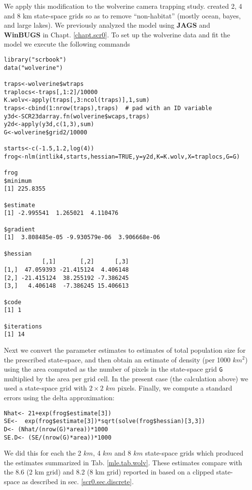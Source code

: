 We apply this modification to the wolverine camera trapping
study. \citet{royle_etal:2011jwm} created 2, 4 and 8 km state-space
grids so as to remove ``non-habitat'' (mostly ocean, bayes, and large
lakes). We previously analyzed the model using {\bf JAGS} and {\bf WinBUGS} in
Chapt. \ref{chapt.scr0}.  To set up the wolverine data and fit the
model we execute the following commands
{\small 
\begin{verbatim}
library("scrbook")
data("wolverine")

traps<-wolverine$wtraps
traplocs<-traps[,1:2]/10000
K.wolv<-apply(traps[,3:ncol(traps)],1,sum)
traps<-cbind(1:nrow(traps),traps)  # pad with an ID variable
y3d<-SCR23darray.fn(wolverine$wcaps,traps)
y2d<-apply(y3d,c(1,3),sum)
G<-wolverine$grid2/10000

starts<-c(-1.5,1.2,log(4))
frog<-nlm(intlik4,starts,hessian=TRUE,y=y2d,K=K.wolv,X=traplocs,G=G)

frog
$minimum
[1] 225.8355

$estimate
[1] -2.995541  1.265021  4.110476

$gradient
[1]  3.808485e-05 -9.930579e-06  3.906668e-06

$hessian
           [,1]       [,2]      [,3]
[1,]  47.059393 -21.415124  4.406148
[2,] -21.415124  38.255192 -7.386245
[3,]   4.406148  -7.386245 15.406613

$code
[1] 1

$iterations
[1] 14
\end{verbatim}
}

Next we convert the parameter estimates to estimates of total
population size for the prescribed state-space, and then obtain an
estimate of density (per 1000
$km^2$) using the area computed as the number of pixels in the
state-space grid \mbox{\tt G} multiplied by the area per grid cell. In
the present case (the calculation above) we used a state-space grid
with $2 \times 2$ $km$ pixels.  Finally, we compute
a standard errors using the delta approximation: 
\begin{verbatim}
Nhat<- 21+exp(frog$estimate[3])
SE<-  exp(frog$estimate[3])*sqrt(solve(frog$hessian)[3,3])
D<- (Nhat/(nrow(G)*area))*1000
SE.D<- (SE/(nrow(G)*area))*1000
\end{verbatim}
We did this for each the 2 $km$, 4 $km$ and 8 $km$ state-space grids
which produced the estimates summarized in Tab. \ref{mle.tab.wolv}.
These estimates compare with the 8.6 (2 km grid) and 8.2 (8 km grid)
reported in 
\citet{royle_etal:2011jwm} based on a clipped state-space as described
in sec. \ref{scr0.sec.discrete}.

